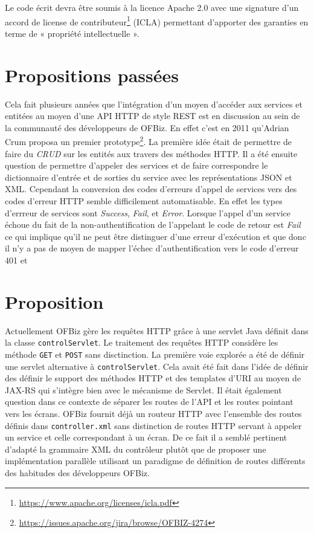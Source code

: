 \documentclass[a4paper, 11pt]{report}
\begin{document}
Le code écrit devra être soumis à la licence Apache 2.0 avec une
signature d'un accord de license de
contributeur\footnote{\url{https://www.apache.org/licenses/icla.pdf}} (ICLA)
permettant d'apporter des garanties en terme de « propriété
intellectuelle ».

\section{Propositions passées}

Cela fait plusieurs années que l'intégration d'un moyen d'accéder aux
services et entitées au moyen d'une API HTTP de style REST est en
discussion au sein de la communauté des développeurs de OFBiz.  En
effet c'est en 2011 qu'Adrian Crum proposa un premier
prototype\footnote{\url{https://issues.apache.org/jira/browse/OFBIZ-4274}}. La
première idée était de permettre de faire du \emph{CRUD} sur les
entités aux travers des méthodes HTTP.  Il a été ensuite question de
permettre d'appeler des services et de faire correspondre le
dictionnaire d'entrée et de sorties du service avec les
représentations JSON et XML.  Cependant la conversion des codes
d'erreurs d'appel de services vers des codes d'erreur HTTP semble
difficilement automatisable.  En effet les types d'errreur de services
sont \emph{Success}, \emph{Fail}, et \emph{Error}.  Lorsque l'appel
d'un service échoue du fait de la non-authentification de l'appelant
le code de retour est \emph{Fail} ce qui implique qu'il ne peut être
distinguer d'une erreur d'exécution et que donc il n'y a pas de moyen
de mapper l'échec d'authentification vers le code d'erreur 401 et

\section{Proposition}

Actuellement OFBiz gère les requêtes HTTP grâce à une servlet Java
\cite{chan2017servlet} définit dans la classe \verb=controlServlet=.
Le traitement des requêtes HTTP considère les méthode \verb=GET= et
\verb=POST= sans disctinction.  La première voie explorée a été de
définir une servlet alternative à \verb=controlServlet=.  Cela avait
été fait dans l'idée de définir des définir le support des méthodes
HTTP et des templates d'URI au moyen de JAX-RS qui s'intègre bien avec
le mécanisme de Servlet. Il était également question dans ce contexte
de séparer les routes de l'API et les routes pointant vers les écrans.
OFBiz fournit déjà un routeur HTTP avec l'ensemble des routes définis
dans \verb=controller.xml= sans distinction de routes HTTP servant à
appeler un service et celle correspondant à un écran.  De ce fait il a
semblé pertinent d'adapté la grammaire XML du contrôleur plutôt que de
proposer une implémentation parallèle utilisant un paradigme de
définition de routes différents des habitudes des développeurs OFBiz.
\end{document}
